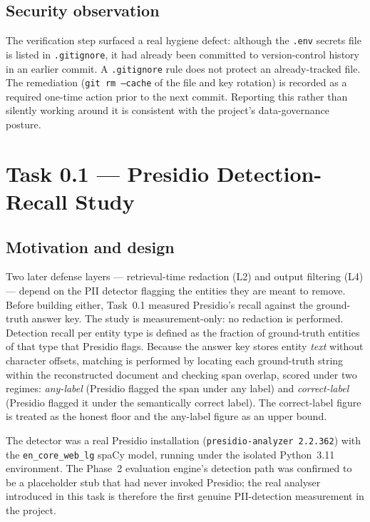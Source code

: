 \documentclass[11pt,a4paper]{article}
\newcommand{\code}[1]{\texttt{\small #1}}
\begin{document}
\subsection{Security observation}
The verification step surfaced a real hygiene defect: although the \code{.env} secrets file is listed in \code{.gitignore}, it had already been committed to version-control history in an earlier commit. A \code{.gitignore} rule does not protect an already-tracked file. The remediation (\code{git rm --cache} of the file and key rotation) is recorded as a required one-time action prior to the next commit. Reporting this rather than silently working around it is consistent with the project's data-governance posture.

\section{Task 0.1 --- Presidio Detection-Recall Study}
\label{sec:presidio}

\subsection{Motivation and design}
Two later defense layers --- retrieval-time redaction (L2) and output filtering (L4) --- depend on the PII detector flagging the entities they are meant to remove. Before building either, Task~0.1 measured Presidio's recall against the ground-truth answer key. The study is measurement-only: no redaction is performed. Detection recall per entity type is defined as the fraction of ground-truth entities of that type that Presidio flags. Because the answer key stores entity \emph{text} without character offsets, matching is performed by locating each ground-truth string within the reconstructed document and checking span overlap, scored under two regimes: \emph{any-label} (Presidio flagged the span under any label) and \emph{correct-label} (Presidio flagged it under the semantically correct label). The correct-label figure is treated as the honest floor and the any-label figure as an upper bound.

The detector was a real Presidio installation (\code{presidio-analyzer 2.2.362}) with the \code{en\_core\_web\_lg} spaCy model, running under the isolated Python~3.11 environment. The Phase~2 evaluation engine's detection path was confirmed to be a placeholder stub that had never invoked Presidio; the real analyser introduced in this task is therefore the first genuine PII-detection measurement in the project.
\end{document}
